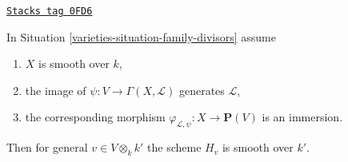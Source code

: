 \begin{lemma}[Bertini]
\label{varieties-lemma-bertini}
\href{https://stacks.math.columbia.edu/tag/0FD6}{\texttt{Stacks tag 0FD6}}

In Situation \ref{varieties-situation-family-divisors} assume
\begin{enumerate}
\item $X$ is smooth over $k$,
\item the image of $\psi : V \to \Gamma(X, \mathcal{L})$
generates $\mathcal{L}$,
\item the corresponding morphism
$\varphi_{\mathcal{L}, \psi} : X \to \mathbf{P}(V)$ is
an immersion.
\end{enumerate}
Then for general $v \in V \otimes_k k'$
the scheme $H_v$ is smooth over $k'$.
\end{lemma}

